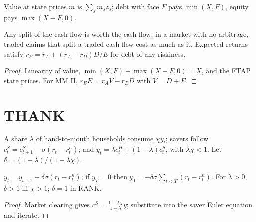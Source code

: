 \begin{definition}
\label{def:mm}
\leanok
Value at state prices $m$ is $\sum_sm_sz_s$; debt with face $F$ pays $\min(X,F)$, equity pays $\max(X-F,0)$.
\end{definition}

\begin{theorem}[MM I and II]
\label{thm:mm}
\leanok
{}
Any split of the cash flow is worth the cash flow; in a market with no arbitrage, traded claims that split a traded cash flow cost
as much as it. Expected returns satisfy $r_E=r_A+(r_A-r_D)D/E$ for debt of any riskiness.
\end{theorem}
\begin{proof}
\leanok
Linearity of value, $\min(X,F)+\max(X-F,0)=X$, and the FTAP state prices. For MM II, $r_EE=r_AV-r_DD$ with $V=D+E$.
\end{proof}

\section{THANK}

\begin{definition}
\label{def:thank}
\leanok
A share $\lambda$ of hand-to-mouth households consume $\chi y_t$; savers follow $c^S_t=c^S_{t+1}-\sigma(r_t-r^n_t)$; and
$y_t=\lambda c^H_t+(1-\lambda)c^S_t$, with $\lambda\chi<1$. Let $\delta=(1-\lambda)/(1-\lambda\chi)$.
\end{definition}

\begin{theorem}
\label{thm:thank}
\leanok
{}
$y_t=y_{t+1}-\delta\sigma(r_t-r^n_t)$; if $y_T=0$ then $y_0=-\delta\sigma\sum_{t<T}(r_t-r^n_t)$. For $\lambda>0$, $\delta>1$ iff
$\chi>1$; $\delta=1$ in RANK.
\end{theorem}
\begin{proof}
\leanok
Market clearing gives $c^S=\frac{1-\lambda\chi}{1-\lambda}y$; substitute into the saver Euler equation and iterate.
\end{proof}

